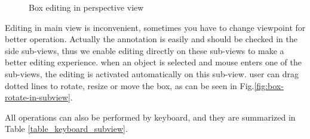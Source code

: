 \documentclass[letterpaper, 10 pt, conference]{ieeeconf}  %
\begin{document}
\begin{figure}[th]
	\centering
	\caption{Box editing in perspective view}
	\label{fig:box-mouse-edit}
\end{figure}

Editing in main view is inconvenient, sometimes you have to change viewpoint for better operation. Actually the annotation is easily and should be checked in the side sub-views, thus we enable editing directly on these sub-views to make a better editing experience. when an object is selected and mouse enters one of the sub-views, the editing is activated automatically on this sub-view. user can drag dotted lines to rotate, resize or move the box, as can be seen in Fig.\ref{fig:box-rotate-in-subview}.

All operations can also be performed by keyboard, and they are summarized in Table \ref{table_keyboard_subview}.
\end{document}
